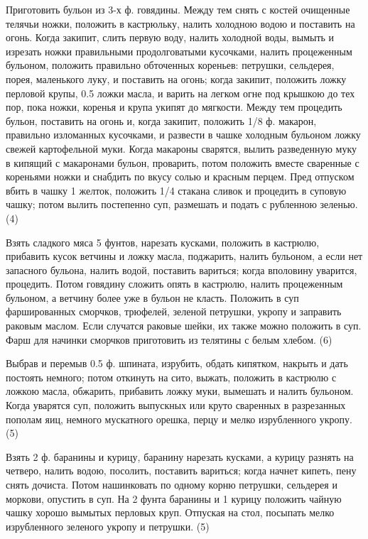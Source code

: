 
Приготовить бульон из 3-х ф. говядины. Между тем снять с костей очищенные телячьи ножки, положить в кастрюльку, налить холодною водою и поставить на огонь. Когда закипит, слить первую воду, налить холодной воды, вымыть и изрезать ножки правильными продолговатыми кусочками, налить процеженным бульоном, положить правильно обточенных кореньев: петрушки, сельдерея, порея, маленького луку, и поставить на огонь; когда закипит, положить ложку перловой крупы, 0.5 ложки масла, и варить на легком огне под крышкою до тех пор, пока ножки, коренья и крупа укипят до мягкости. Между тем процедить бульон, поставить на огонь и, когда закипит, положить 1/8 ф. макарон, правильно изломанных кусочками, и развести в чашке холодным бульоном ложку свежей картофельной муки. Когда макароны сварятся, вылить разведенную муку в кипящий с макаронами бульон, проварить, потом положить вместе сваренные с кореньями ножки и снабдить по вкусу солью и красным перцем. Пред отпуском вбить в чашку 1 желток, положить 1/4 стакана сливок и процедить в суповую чашку; потом вылить постепенно суп, размешать и подать с рубленною зеленью. (4)


Взять сладкого мяса 5 фунтов, нарезать кусками, положить в кастрюлю, прибавить кусок ветчины и ложку масла, поджарить, налить бульоном, а если нет запасного бульона, налить водой, поставить вариться; когда вполовину уварится, процедить. Потом говядину сложить опять в кастрюлю, налить процеженным бульоном, а ветчину более уже в бульон не класть. Положить в суп фаршированных сморчков, трюфелей, зеленой петрушки, укропу и заправить раковым маслом. Если случатся раковые шейки, их также можно положить в суп. Фарш для начинки сморчков приготовить из телятины с белым хлебом. (6)


Выбрав и перемыв 0.5 ф. шпината, изрубить, обдать кипятком, накрыть и дать постоять немного; потом откинуть на сито, выжать, положить в кастрюлю с ложкою масла, обжарить, прибавить ложку муки, вымешать и налить бульоном. Когда уварятся суп, положить выпускных или круто сваренных в разрезанных пополам яиц, немного мускатного орешка, перцу и мелко изрубленного укропу. (5)


Взять 2 ф. баранины и курицу, баранину нарезать кусками, а курицу разнять на четверо, налить водою, посолить, поставить вариться; когда начнет кипеть, пену снять дочиста. Потом нашинковать по одному корню петрушки, сельдерея и моркови, опустить в суп. На 2 фунта баранины и 1 курицу положить чайную чашку хорошо вымытых перловых круп. Отпуская на стол, посыпать мелко изрубленного зеленого укропу и петрушки. (5)

